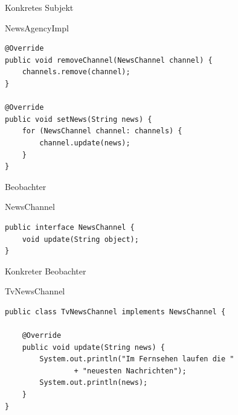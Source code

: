 \begin{frame}[fragile]{Konkretes Subjekt}
	\begin{exampleblock}{NewsAgencyImpl}
 		\begin{lstlisting}
@Override
public void removeChannel(NewsChannel channel) {
    channels.remove(channel);
}

@Override
public void setNews(String news) {
    for (NewsChannel channel: channels) {
        channel.update(news);
    }
}
 		\end{lstlisting}
 	\end{exampleblock}
\end{frame}

\begin{frame}[fragile]{Beobachter}
	\begin{exampleblock}{NewsChannel}
 		\begin{lstlisting}
public interface NewsChannel {
	void update(String object);
}
 		\end{lstlisting}
 	\end{exampleblock}
\end{frame}

\begin{frame}[fragile]{Konkreter Beobachter}
	\begin{exampleblock}{TvNewsChannel}
 		\begin{lstlisting}
public class TvNewsChannel implements NewsChannel {

	@Override
	public void update(String news) {
		System.out.println("Im Fernsehen laufen die "
				+ "neuesten Nachrichten");
		System.out.println(news);
	}
} 		    
 		\end{lstlisting}
 	\end{exampleblock}
\end{frame}


